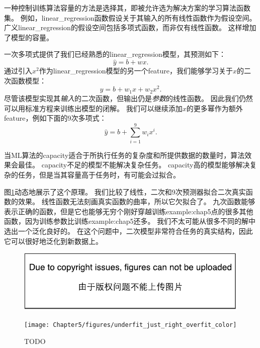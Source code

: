 一种控制训练算法容量的方法是选择其，即被允许选为解决方案的学习算法函数集。
例如，\gls{linear_regression}函数假设关于其输入的所有线性函数作为假设空间。
广义\gls{linear_regression}的假设空间包括多项式函数，而非仅有线性函数。
这样增加了模型的容量。

一次多项式提供了我们已经熟悉的\gls{linear_regression}模型，其预测如下：
\begin{equation}
    \hat{y} = b + wx.
\end{equation}
通过引入$x^2$作为\gls{linear_regression}模型的另一个\gls{feature}，我们能够学习关于$x$的二次函数模型：
\begin{equation}
    \hat{y} = b + w_1x + w_2x^2.
\end{equation}
尽管该模型实现其\emph{输入}的二次函数，但输出仍是\emph{参数}的线性函数。
因此我们仍然可以用标准方程来训练出模型的闭解。
我们可以继续添加$x$的更多幂作为额外\gls{feature}，例如下面的$9$次多项式：
\begin{equation}
    \hat{y} = b + \sum_{i=1}^9 w_i x^i.
\end{equation}

当\gls{ML}算法的\gls{capacity}适合于所执行任务的复杂度和所提供数据的数量时，算法效果会最佳。
\gls{capacity}不足的模型不能解决复杂任务。
\gls{capacity}高的模型能够解决复杂的任务，但是当其容量高于任务时，有可能会过拟合。

图\ref{fig:chap5_underfit_just_right_overfit}动态地展示了这个原理。
我们比较了线性，二次和$9$次预测器拟合二次真实函数的效果。
线性函数无法刻画真实函数的曲率，所以它欠拟合了。
九次函数能够表示正确的函数，但是它也能够无穷个刚好穿越训练\gls{example:chap5}点的很多其他函数，因为训练参数比训练\gls{example:chap5}还多。
我们不太可能从很多不同的解中选出一个泛化良好的。
在这个问题中，二次模型非常符合任务的真实结构，因此它可以很好地泛化到新数据上。

\begin{figure}[!htb]
\ifOpenSource
\centerline{\includegraphics{figure.pdf}}
\else
\centerline{\texttt{[image: Chapter5/figures/underfit\_just\_right\_overfit\_color]}}
\fi
\caption{TODO}
\label{fig:chap5_underfit_just_right_overfit}
\end{figure}


